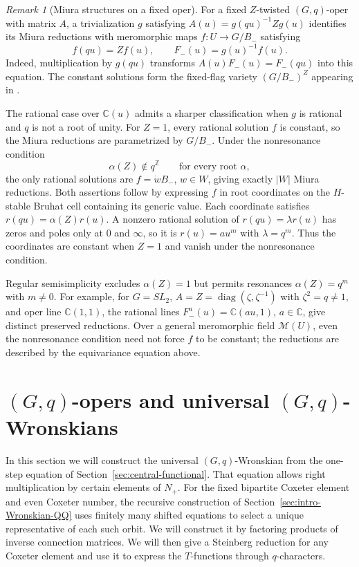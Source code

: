 \documentclass[11pt,leqno]{amsart}
\numberwithin{equation}{section}
\theoremstyle{plain}
\theoremstyle{definition}
\theoremstyle{plain}
\theoremstyle{definition}
\theoremstyle{remark}
\newtheorem{remark}[theorem]{Remark}
\begin{document}
\begin{remark}[Miura structures on a fixed oper]\label{rem:Miura-structures-fixed-oper}
For a fixed $Z$-twisted $(G,q)$-oper with matrix $A$, a trivialization $g$ satisfying $A(u)=g(qu)^{-1}Zg(u)$ identifies its Miura reductions with meromorphic maps $f:U\to G/B_-$ satisfying
\[
 f(qu)=Zf(u),\qquad F_-(u)=g(u)^{-1}f(u).
\]
Indeed, multiplication by $g(qu)$ transforms $A(u)F_-(u)=F_-(qu)$ into this equation.  The constant solutions form the fixed-flag variety $(G/B_-)^Z$ appearing in \cite[Proposition~3.3]{FKSZ2020}.

The rational case over $\mathbb C(u)$ admits a sharper classification when $g$ is rational and $q$ is not a root of unity.  For $Z=1$, every rational solution $f$ is constant, so the Miura reductions are parametrized by $G/B_-$.  Under the nonresonance condition
\[
 \alpha(Z)\notin q^{\mathbb Z}\qquad\text{for every root }\alpha,
\]
the only rational solutions are $f=\dot wB_-$, $w\in W$, giving exactly $|W|$ Miura reductions.  Both assertions follow by expressing $f$ in root coordinates on the $H$-stable Bruhat cell containing its generic value.  Each coordinate satisfies $r(qu)=\alpha(Z)r(u)$.  A nonzero rational solution of $r(qu)=\lambda r(u)$ has zeros and poles only at $0$ and $\infty$, so it is $r(u)=au^m$ with $\lambda=q^m$.  Thus the coordinates are constant when $Z=1$ and vanish under the nonresonance condition.

Regular semisimplicity excludes $\alpha(Z)=1$ but permits resonances $\alpha(Z)=q^m$ with $m\ne0$.  For example, for $G=SL_2$, $A=Z=\operatorname{diag}(\zeta,\zeta^{-1})$ with $\zeta^2=q\ne1$, and oper line $\mathbb C(1,1)$, the rational lines $F_-^a(u)=\mathbb C(au,1)$, $a\in\mathbb C$, give distinct preserved reductions.  Over a general meromorphic field $\mathcal M(U)$, even the nonresonance condition need not force $f$ to be constant; the reductions are described by the equivariance equation above.
\end{remark}

\section{\texorpdfstring{$(G,q)$}{(G,q)}-opers and universal \texorpdfstring{$(G,q)$}{(G,q)}-Wronskians}
In this section we will construct the universal $(G,q)$-Wronskian from the one-step equation of Section~\ref{sec:central-functional}.  That equation allows right multiplication by certain elements of $N_+$.  For the fixed bipartite Coxeter element and even Coxeter number, the recursive construction of Section~\ref{sec:intro-Wronskian-QQ} uses finitely many shifted equations to select a unique representative of each such orbit.  We will construct it by factoring products of inverse connection matrices.  We will then give a Steinberg reduction for any Coxeter element and use it to express the $T$-functions through $q$-characters.
\end{document}
